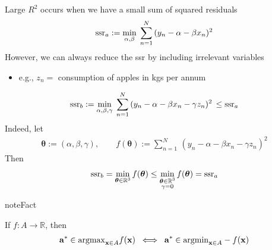 \documentclass[letterpaper,10pt,english]{jupyterBook}
\begin{document}
\sphinxAtStartPar
Large \(R^2\) occurs when we have a small sum of squared residuals
\begin{equation*}
\begin{split}
%
{\rm ssr}_a := 
\min_{\alpha, \beta} 
\; \sum_{n=1}^N \, (y_n - \alpha - \beta x_n)^2
%
\end{split}
\end{equation*}
\sphinxAtStartPar
However, we can always reduce the ssr by including irrelevant variables
\begin{itemize}
\item {} 
\sphinxAtStartPar
e.g., \(z_n = \) consumption of apples in kgs per annum

\end{itemize}
\begin{equation*}
\begin{split}
%
{\rm ssr}_b := 
\min_{\alpha, \beta, \gamma} 
\; \sum_{n=1}^N \, (y_n - \alpha - \beta x_n - \gamma z_n)^2
\, \leq {\rm ssr}_a
%
\end{split}
\end{equation*}
\sphinxAtStartPar
Indeed, let
\begin{equation*}
\begin{split}
%
{\boldsymbol \theta} 
:= (\alpha, \beta, \gamma),
\qquad
f({\boldsymbol \theta}) 
:= 
\sum_{n=1}^N \, (y_n - \alpha - \beta x_n - \gamma z_n)^2
%
\end{split}
\end{equation*}
\sphinxAtStartPar
Then
\begin{equation*}
\begin{split}
%
{\rm ssr}_b 
= \min_{{\boldsymbol \theta} \in \mathbb{R}^3} f({\boldsymbol \theta})
\leq 
\min_{\substack{{\boldsymbol \theta} \in \mathbb{R}^3 \\ \gamma = 0}} f({\boldsymbol \theta})
= {\rm ssr}_a
%
\end{split}
\end{equation*}
\begin{sphinxadmonition}{note}{Fact}

\sphinxAtStartPar
If \(f \colon A \to \mathbb{R}\), then
\begin{equation*}
\begin{split}
%
{\bf a}^* \in \mathrm{argmax}_{{\bf x} \in A}f({\bf x})
\; \iff \;
{\bf a}^* \in \mathrm{argmin}_{{\bf x} \in A} -f({\bf x})
%
\end{split}
\end{equation*}\end{sphinxadmonition}
\end{document}

